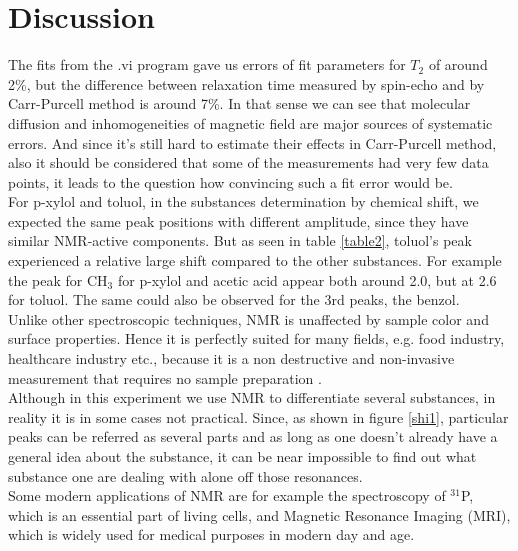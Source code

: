 \section{Discussion}
The fits from the .vi program gave us errors of fit parameters for $T_2$  of around 2\%, but the difference between relaxation time measured by spin-echo and by Carr-Purcell method is around 7\%. In that sense we can see that molecular diffusion and inhomogeneities of magnetic field are major sources of systematic errors. And since it's still hard to estimate their effects in Carr-Purcell method, also it should be considered that some of the measurements had very few data points, it leads to the question how convincing such a fit error would be.
\vspace{3mm}\\
For p-xylol and toluol, in the substances determination by chemical shift, we expected the same peak positions with different amplitude, since they have similar NMR-active components. But as seen in table \ref{table2}, toluol's peak experienced a relative large shift compared to the other substances. For example the peak for CH$_3$ for p-xylol and acetic acid appear both around 2.0, but at 2.6 for toluol. The same could also be observed for the 3rd peaks, the benzol.
\vspace{5mm}\\
Unlike other spectroscopic techniques, NMR is unaffected by sample color and surface properties. Hence it is perfectly suited for many fields, e.g. food industry, healthcare industry etc., because it is a non destructive and non-invasive measurement that requires no sample preparation \cite{bruker}.\\
Although in this experiment we use NMR to differentiate several substances, in reality it is in some cases not practical. Since, as shown in figure \ref{shi1}, particular peaks can be referred as several parts and as long as one doesn't already have a general idea about the substance, it can be near impossible to find out what substance one are dealing with alone off those resonances. 
\vspace{3mm}\\
Some modern applications of NMR are for example the spectroscopy of $^{31}$P, which is an essential part of living cells, and Magnetic Resonance Imaging (MRI), which is widely used for medical purposes in modern day and age.\\